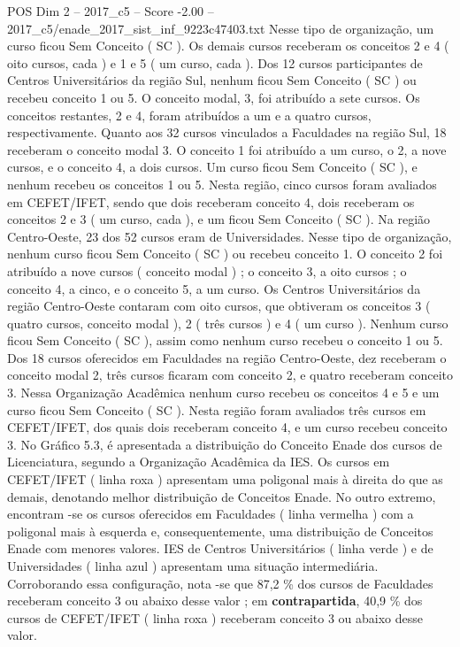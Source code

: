 \begin{textsample}{POS Dim 2 – 2017\_c5 – Score -2.00 – 2017\_c5/enade\_2017\_sist\_inf\_9223c47403.txt}
Nesse tipo de organização, um curso ficou Sem Conceito ( SC ).
Os demais cursos receberam os conceitos 2 e 4 ( oito cursos, cada ) e 1 e 5 ( um curso, cada ).
Dos 12 cursos participantes de Centros Universitários da região Sul, nenhum ficou Sem Conceito ( SC ) ou recebeu conceito 1 ou 5.
O conceito modal, 3, foi atribuído a sete cursos.
Os conceitos restantes, 2 e 4, foram atribuídos a um e a quatro cursos, respectivamente.
Quanto aos 32 cursos vinculados a Faculdades na região Sul, 18 receberam o conceito modal 3.
O conceito 1 foi atribuído a um curso, o 2, a nove cursos, e o conceito 4, a dois cursos.
Um curso ficou Sem Conceito ( SC ), e nenhum recebeu os conceitos 1 ou 5.
Nesta região, cinco cursos foram avaliados em CEFET/IFET, sendo que dois receberam conceito 4, dois receberam os conceitos 2 e 3 ( um curso, cada ), e um ficou Sem Conceito ( SC ).
Na região Centro-Oeste, 23 dos 52 cursos eram de Universidades.
Nesse tipo de organização, nenhum curso ficou Sem Conceito ( SC ) ou recebeu conceito 1.
O conceito 2 foi atribuído a nove cursos ( conceito modal ) ; o conceito 3, a oito cursos ; o conceito 4, a cinco, e o conceito 5, a um curso.
Os Centros Universitários da região Centro-Oeste contaram com oito cursos, que obtiveram os conceitos 3 ( quatro cursos, conceito modal ), 2 ( três cursos ) e 4 ( um curso ).
Nenhum curso ficou Sem Conceito ( SC ), assim como nenhum curso recebeu o conceito 1 ou 5.
Dos 18 cursos oferecidos em Faculdades na região Centro-Oeste, dez receberam o conceito modal 2, três cursos ficaram com conceito 2, e quatro receberam conceito 3.
Nessa Organização Acadêmica nenhum curso recebeu os conceitos 4 e 5 e um curso ficou Sem Conceito ( SC ).
Nesta região foram avaliados três cursos em CEFET/IFET, dos quais dois receberam conceito 4, e um curso recebeu conceito 3.
No Gráfico 5.3, é apresentada a distribuição do Conceito Enade dos cursos de Licenciatura, segundo a Organização Acadêmica da IES.
Os cursos em CEFET/IFET ( linha roxa ) apresentam uma poligonal mais à direita do que as demais, denotando melhor distribuição de Conceitos Enade.
No outro extremo, encontram -se os cursos oferecidos em Faculdades ( linha vermelha ) com a poligonal mais à esquerda e, consequentemente, uma distribuição de Conceitos Enade com menores valores.
IES de Centros Universitários ( linha verde ) e de Universidades ( linha azul ) apresentam uma situação intermediária.
Corroborando essa configuração, nota -se que 87,2 \% dos cursos de Faculdades receberam conceito 3 ou abaixo desse valor ; em \textbf{contrapartida}, 40,9 \% dos cursos de CEFET/IFET ( linha roxa ) receberam conceito 3 ou abaixo desse valor.

\end{textsample}
